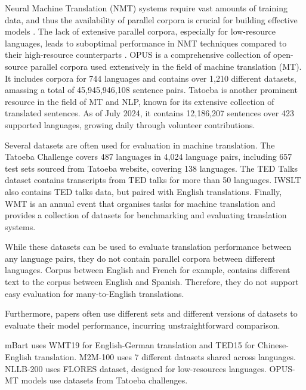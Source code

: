 \documentclass[a4paper]{article}
\begin{document}
Neural Machine Translation (NMT) systems require vast amounts of training data, and thus the availability of parallel corpora is crucial for building effective models \cite{koehn-2017-challenges}. The lack of extensive parallel corpora, especially for low-resource languages, leads to suboptimal performance in NMT techniques compared to their high-resource counterparts \cite{ranathunga-2023-nmt-low-res}. OPUS \cite{opus} is a comprehensive collection of open-source parallel corpora used extensively in the field of machine translation (MT). It includes corpora for 744 languages and contains over 1,210 different datasets, amassing a total of 45,945,946,108 sentence pairs. Tatoeba \cite{tatoeba} is another prominent resource in the field of MT and NLP, known for its extensive collection of translated sentences. As of July 2024, it contains 12,186,207 sentences over 423 supported languages, growing daily through volunteer contributions.

Several datasets are often used for evaluation in machine translation. The Tatoeba Challenge \cite{tiedemann-2020-tatoeba-challenge} covers 487 languages in 4,024 language pairs, including 657 test sets sourced from Tatoeba website, covering 138 languages. The TED Talks dataset \cite{ye-2018-word-embeddings-ted} contains transcripts from TED talks for more than 50 languages. IWSLT \cite{agarwal-iwstl-2023} also contains TED talks data, but paired with English translations. Finally, WMT \cite{barrault-2020-wmt} is an annual event that organises tasks for machine translation and provides a collection of datasets for benchmarking and evaluating translation systems.

While these datasets can be used to evaluate translation performance between any language pairs, they do not contain parallel corpora between different languages. Corpus between English and French for example, contains different text to the corpus between English and Spanish. Therefore, they do not support easy evaluation for many-to-English translations.

Furthermore, papers often use different sets and different versions of datasets to evaluate their model performance, incurring unstraightforward comparison.

mBart \cite{liu-2020-mbart} uses WMT19 for English-German translation and TED15 for Chinese-English translation. M2M-100 \cite{fan-2020-m2m100} uses 7 different datasets shared across languages. NLLB-200  \cite{nllb200-2020} uses FLORES dataset, designed for low-resources languages. OPUS-MT \cite{tiedemann-2023-democratizing,tiedemann-2020-opus-mt} models use datasets from Tatoeba challenges.
\end{document}
